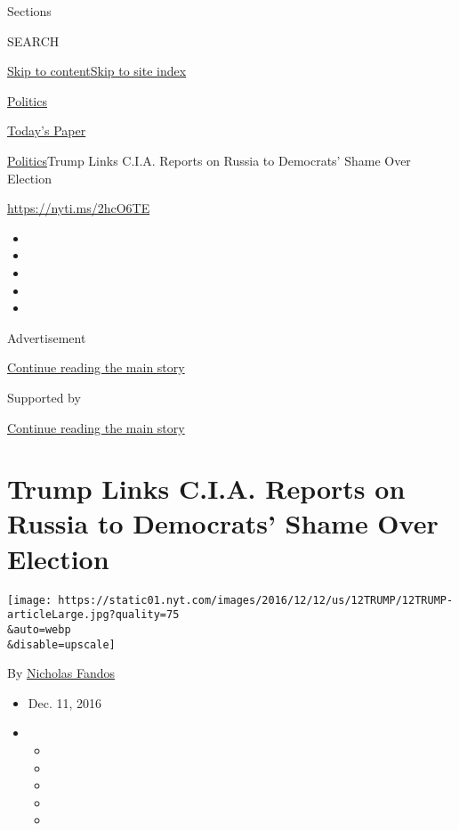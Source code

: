 Sections

SEARCH

\protect\hyperlink{site-content}{Skip to
content}\protect\hyperlink{site-index}{Skip to site index}

\href{https://www.nytimes.com/section/politics}{Politics}

\href{https://myaccount.nytimes.com/auth/login?response_type=cookie\&client_id=vi}{}

\href{https://www.nytimes.com/section/todayspaper}{Today's Paper}

\href{/section/politics}{Politics}\textbar{}Trump Links C.I.A. Reports
on Russia to Democrats' Shame Over Election

\url{https://nyti.ms/2hcO6TE}

\begin{itemize}
\item
\item
\item
\item
\item
\end{itemize}

Advertisement

\protect\hyperlink{after-top}{Continue reading the main story}

Supported by

\protect\hyperlink{after-sponsor}{Continue reading the main story}

\hypertarget{trump-links-cia-reports-on-russia-to-democrats-shame-over-election}{%
\section{Trump Links C.I.A. Reports on Russia to Democrats' Shame Over
Election}\label{trump-links-cia-reports-on-russia-to-democrats-shame-over-election}}

\texttt{[image: https://static01.nyt.com/images/2016/12/12/us/12TRUMP/12TRUMP-articleLarge.jpg?quality=75\\\&auto=webp\\\&disable=upscale]}

By \href{https://www.nytimes.com/by/nicholas-fandos}{Nicholas Fandos}

\begin{itemize}
\item
  Dec. 11, 2016
\item
  \begin{itemize}
  \item
  \item
  \item
  \item
  \item
  \end{itemize}
\end{itemize}

